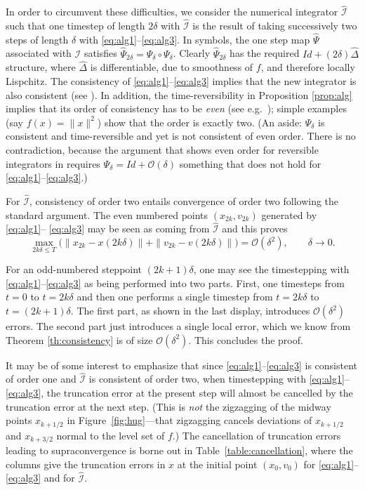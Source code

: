\documentclass[10pt]{article}
\begin{document}
In order to circumvent these difficulties,  we consider the numerical integrator \(\widehat{\mathcal I}\) such that one timestep of length \(2\delta\) with \(\widehat{\mathcal I}\) is the result
of taking successively two steps of length \(\delta\) with  \eqref{eq:alg1}--\eqref{eq:alg3}. In symbols, the one step map \(\widehat{\Psi}\) associated with \(\mathcal I\) satisfies \(\widehat{\Psi}_{2\delta}=\Psi_\delta\circ\Psi_\delta\). Clearly \(\widehat{\Psi}_{2\delta}\) has the required \(Id+(2\delta) \widehat\Delta\) structure, where \(\widehat\Delta\) is differentiable, due to smoothness of \(f\), and therefore locally Lispchitz. The consistency of \eqref{eq:alg1}--\eqref{eq:alg3} implies  that the new integrator is also consistent (see \cite[Theorem II.4.1]{geom}).
In addition, the time-reversibility in Proposition \ref{prop:alg} implies that its order of consistency has to be \emph{even} (see e.g.\ \cite[Section II.3, Section V.1]{geom}); simple examples (say \(f(x) = \|x\|^2\)) show that the order is exactly two.
(An aside: \(\Psi_\delta\) is consistent and time-reversible and yet is not consistent of even order. There is no contradiction, because the argument that shows even order for reversible integrators in \cite[Section II.3, Section V.1]{geom} requires \(\Psi_\delta= Id+\mathcal{O}(\delta)\) something that does not hold for
\eqref{eq:alg1}--\eqref{eq:alg3}.)

For  \(\widehat{\mathcal I}\),
consistency of order two  entails convergence of order two following the standard argument. The even numbered points \((x_{2k},v_{2k})\) generated by \eqref{eq:alg1}--
\eqref{eq:alg3} may be seen as coming from \(\widehat{\mathcal I}\) and this proves
\[
\max_{2k\delta\leq T} \Big(\|x_{2k}-x(2k\delta)\|+\|v_{2k}-v(2k\delta)\|\Big) = \mathcal{O}(\delta^2),\qquad \delta\rightarrow 0.
\]

For an odd-numbered steppoint \((2k+1)\delta\), one may see the timestepping with  \eqref{eq:alg1}--\eqref{eq:alg3} as being performed into two parts. First, one timesteps from \(t=0\) to
\(t=2k\delta\) and then one performs a single timestep from \(t=2k\delta\) to \(t=(2k+1)\delta\). The first part, as  shown in the last display, introduces \(\mathcal{O}(\delta^2)\) errors. The second part just introduces a single local error, which we know from Theorem \ref{th:consistency} is of size \(\mathcal{O}(\delta^2)\). This concludes the proof.


It may be of some interest to emphasize that since \eqref{eq:alg1}--\eqref{eq:alg3} is consistent of order one and \(\widehat{\mathcal I}\) is consistent of order two, when timestepping with \eqref{eq:alg1}--\eqref{eq:alg3}, the truncation error at the present step will almost be cancelled by the truncation error at the next step. (This is \emph{not} the zigzagging of the midway points \(x_{k+1/2}\) in Figure~\ref{fig:hug}---that zigzagging cancels deviations of \(x_{k+1/2}\) and \(x_{k+3/2}\) normal to the level set of \(f\).) The cancellation of truncation errors leading to supraconvergence is borne out in Table~\ref{table:cancellation}, where the columns give the truncation errors in \(x\) at the initial point \((x_0,v_0)\) for \eqref{eq:alg1}--\eqref{eq:alg3} and for \(\widehat{\mathcal I}\).
\end{document}
